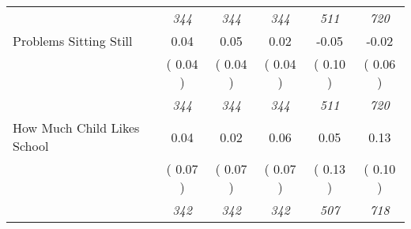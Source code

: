 \begin{tabular}{l c c c c c}
& \textit{ 344 } & \textit{ 344 } & \textit{ 344 } & \textit{ 511 } & \textit{ 720 } \\
Problems Sitting Still &      0.04 &      0.05 &      0.02 &     -0.05 &     -0.02 \\
& (     0.04 ) & (     0.04 ) & (     0.04 ) & (     0.10 ) & (     0.06 ) \\
& \textit{ 344 } & \textit{ 344 } & \textit{ 344 } & \textit{ 511 } & \textit{ 720 } \\
How Much Child Likes School &      0.04 &      0.02 &      0.06 &      0.05 &      0.13 \\
& (     0.07 ) & (     0.07 ) & (     0.07 ) & (     0.13 ) & (     0.10 ) \\
& \textit{ 342 } & \textit{ 342 } & \textit{ 342 } & \textit{ 507 } & \textit{ 718 } \\
\bottomrule
\end{tabular}
